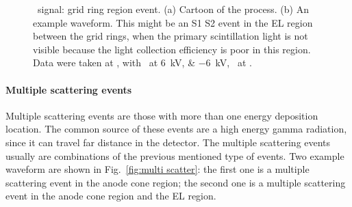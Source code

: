 \begin{figure}[!htbp]
\begin{subfigure}[b]{0.7\textwidth}
		\caption{}
		\label{fig:}
	\end{subfigure}
	\caption[\gtest\ signal: grid ring region event.]{\gtest\ signal: grid ring region event. (a) Cartoon of the process. (b) An example waveform. This might be an S1 S2 event in the EL region between the grid rings, when the primary scintillation light is not visible because the light collection efficiency is poor in this region. Data were taken at , with \opvtvb\ at \SIlist{+6;-6}{kV}, \opgd\ at \standarddensity .%
	}
	\label{fig:ring rad}

\end{figure}

\paragraph{Multiple scattering events}
\label{sec:events particle multiple scatter}
Multiple scattering events are those with more than one energy deposition location. The common source of these events are a high energy gamma radiation, since it can travel far distance in the detector. The multiple scattering events usually are combinations of the previous mentioned type of events. Two example waveform are shown in Fig.~\ref{fig:multi scatter}: the first one is a multiple scattering event in the anode cone region; the second one is a multiple scattering event in the anode cone region and the EL region.

